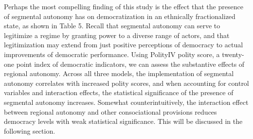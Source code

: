\documentclass[12pt]{article}
\begin{document}
Perhaps the most compelling finding of this study is the effect that the presence of segmental autonomy has on democratization in an ethnically fractionalized state, as shown in Table 5. Recall that segmental autonomy can serve to legitimize a regime by granting power to a diverse range of actors, and that legitimization may extend from just positive perceptions of democracy to actual improvements of democratic performance. Using PolityIV polity score, a twenty-one point index of democratic indicators, we can assess the substantive effects of regional autonomy. Across all three models, the implementation of segmental autonomy correlates with increased polity scores, and when accounting for control variables and interaction effects, the statistical significance of the presence of segmental autonomy increases. Somewhat counterintuitively, the interaction effect between regional autonomy and other consociational provisions reduces democracy levels with weak statistical significance. This will be discussed in the following section. 
\end{document}
